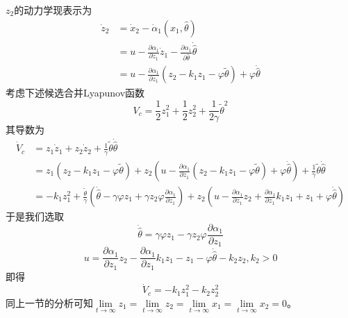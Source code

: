 $z_2$的动力学现表示为
\begin{align*}
  \dot{z}_2 & = \dot{x}_2 - \dot{\alpha}_1 (x_1, \hat{\theta})\\
  & = u - \frac{\partial \alpha_1}{\partial z_1} \dot{z}_1 - \frac{\partial
  \alpha_1}{\partial \hat{\theta} } \dot{\hat{\theta}} \\
  & = u - \frac{\partial \alpha_1}{\partial z_1} (z_2 - k_1 z_1 - \varphi
  \tilde{\theta}) + \varphi \dot{\hat{\theta} }
\end{align*}
考虑下述候选合并Lyapunov函数
\[ V_c = \frac{1}{2} z^2_1 + \frac{1}{2} z^2_2 + \frac{1}{2 \gamma }
   \tilde{\theta}^2 \]
其导数为
\begin{align*}
  \dot{V}_c & = z_1 \dot{z}_1 + z_2 \dot{z}_2 + \frac{1}{\gamma}
  \tilde{\theta} \dot{\hat{\theta}}\\
  & = z_1 (z_2 - k_1 z_1 - \varphi \tilde{\theta}) + z_2 \left( u -
  \frac{\partial \alpha_1}{\partial z_1} (z_2 - k_1 z_1 - \varphi
  \tilde{\theta}) + \varphi \dot{\hat{\theta} } \right) + \frac{1}{\gamma}
  \tilde{\theta} \dot{\hat{\theta}}\\
  & = - k_1 z^2_1 + \frac{\tilde{\theta}}{\gamma} \left( \dot{\hat{\theta}}
  - \gamma \varphi z_1 + \gamma z_2 \varphi \frac{\partial \alpha_1}{\partial
  z_1} \right) + z_2 \left( u - \frac{\partial \alpha_1}{\partial z_1} z_2 +
  \frac{\partial \alpha_1}{\partial z_1} k_1 z_1 + z_1 + \varphi
  \dot{\hat{\theta} } \right)
\end{align*}
于是我们选取
\[ \dot{\hat{\theta}} = \gamma \varphi z_1 - \gamma z_2 \varphi \frac{\partial
   \alpha_1}{\partial z_1} \]
\[ u = \frac{\partial \alpha_1}{\partial z_1} z_2 - \frac{\partial
   \alpha_1}{\partial z_1} k_1 z_1 - z_1 - \varphi \dot{\hat{\theta} } - k_2
   z_2, k_2 > 0 \]
即得
\[ \dot{V}_c = - k_1 z^2_1 - k_2 z^2_2 \]
同上一节的分析可知$\lim\limits_{t \rightarrow \infty} z_1 = \lim\limits_{t \rightarrow
\infty} z_2 =\lim\limits_{t \rightarrow \infty} x_1 = \lim\limits_{t \rightarrow \infty} x_2 = 0$。
